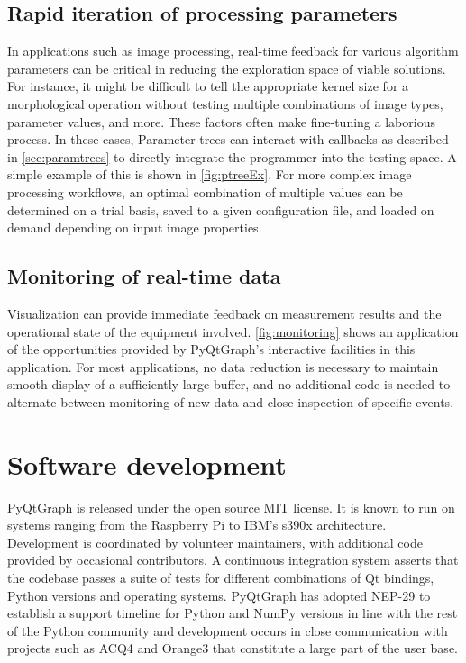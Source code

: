 \documentclass[journal]{vgtc}                %
\begin{document}
\subsection{Rapid iteration of processing parameters}
In applications such as image processing, real-time feedback for various algorithm parameters can be critical in reducing the exploration space of viable solutions. For instance, it might be difficult to tell the appropriate kernel size for a morphological operation without testing multiple combinations of image types, parameter values, and more. These factors often make fine-tuning a laborious process. In these cases, Parameter trees can interact with callbacks as described in \autoref{sec:paramtrees} to directly integrate the programmer into the testing space. A simple example of this is shown in \autoref{fig:ptreeEx}. For more complex image processing workflows, an optimal combination of multiple values can be determined on a trial basis, saved to a given configuration file, and loaded on demand depending on input image properties.
\makePtreeExFig

\subsection{Monitoring of real-time data}
\makeMonitoringFig
Visualization can provide immediate feedback on measurement results and the operational state of the equipment involved. \autoref{fig:monitoring} shows an application of the opportunities provided by PyQtGraph's interactive facilities in this application. For most applications, no data reduction is necessary to maintain smooth display of a sufficiently large buffer, and no additional code is needed to alternate between monitoring of new data and close inspection of specific events.
\color{black}

\section{Software development}
PyQtGraph is released under the open source MIT license. It is known to run on systems ranging from the Raspberry Pi to IBM's s390x architecture. Development is coordinated by volunteer maintainers, with additional code provided by occasional contributors. A continuous integration system asserts that the codebase passes a suite of tests for different combinations of Qt bindings, Python versions and operating systems. PyQtGraph has adopted NEP-29\cite{NEP-29} to establish a support timeline for Python and NumPy versions in line with the rest of the Python community and development occurs in close communication with projects such as ACQ4\cite{10.3389/fninf.2014.00003} and Orange3\cite{JMLR:demsar13a} that constitute a large part of the user base.
\end{document}
